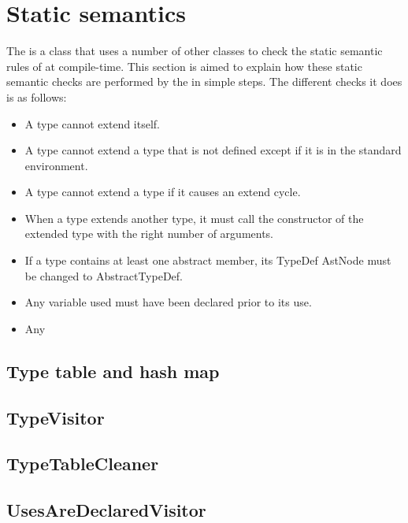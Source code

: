\section{Static semantics}
The  is a class that uses a number of other classes to check the static semantic rules of \productname{} at compile-time. This section is aimed to explain how these static semantic checks are performed by the  in simple steps. The different checks it does is as follows:
\begin{itemize}
\item A type cannot extend itself.
\item A type cannot extend a type that is not defined except if it is in the standard environment.
\item A type cannot extend a type if it causes an extend cycle.
\item When a type extends another type, it must call the constructor of the extended type with the right number of arguments.
\item If a type contains at least one abstract member, its TypeDef AstNode must be changed to AbstractTypeDef.
\item Any variable used must have been declared prior to its use.
\item Any 
\end{itemize}

\subsection{Type table and hash map}

\subsection{TypeVisitor}

\subsection{TypeTableCleaner}

\subsection{UsesAreDeclaredVisitor}
